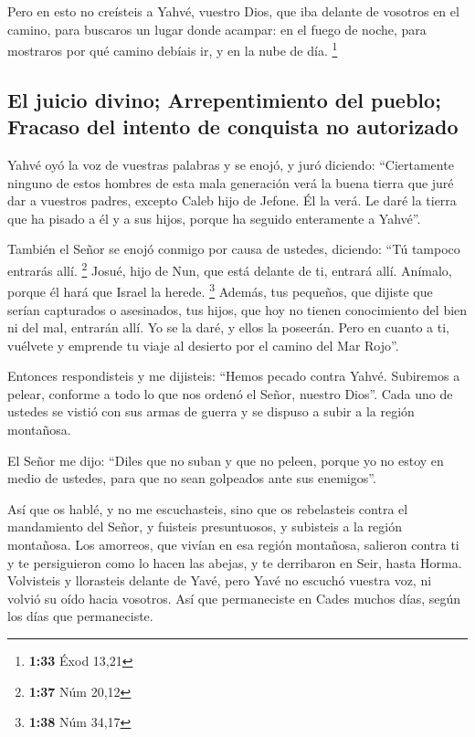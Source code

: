 \begin{paracol}{2}
 Pero en esto no creísteis a Yahvé, vuestro Dios,
 que iba delante de vosotros en el camino, para buscaros
un lugar donde acampar: en el fuego de noche, para mostraros por qué
camino debíais ir, y en la nube de día. \footnote{\textbf{1:33} Éxod
  13,21}

\hypertarget{el-juicio-divino-arrepentimiento-del-pueblo-fracaso-del-intento-de-conquista-no-autorizado}{%
\subsection{El juicio divino; Arrepentimiento del pueblo; Fracaso del
intento de conquista no
autorizado}\label{el-juicio-divino-arrepentimiento-del-pueblo-fracaso-del-intento-de-conquista-no-autorizado}}

 Yahvé oyó la voz de vuestras palabras y se enojó, y juró
diciendo:  ``Ciertamente ninguno de estos hombres de esta
mala generación verá la buena tierra que juré dar a vuestros padres,
 excepto Caleb hijo de Jefone. Él la verá. Le daré la
tierra que ha pisado a él y a sus hijos, porque ha seguido enteramente a
Yahvé''.

 También el Señor se enojó conmigo por causa de ustedes,
diciendo: ``Tú tampoco entrarás allí. \footnote{\textbf{1:37} Núm 20,12}
 Josué, hijo de Nun, que está delante de ti, entrará
allí. Anímalo, porque él hará que Israel la herede. \footnote{\textbf{1:38}
  Núm 34,17}  Además, tus pequeños, que dijiste que
serían capturados o asesinados, tus hijos, que hoy no tienen
conocimiento del bien ni del mal, entrarán allí. Yo se la daré, y ellos
la poseerán.  Pero en cuanto a ti, vuélvete y emprende tu
viaje al desierto por el camino del Mar Rojo''.

 Entonces respondisteis y me dijisteis: ``Hemos pecado
contra Yahvé. Subiremos a pelear, conforme a todo lo que nos ordenó el
Señor, nuestro Dios''. Cada uno de ustedes se vistió con sus armas de
guerra y se dispuso a subir a la región montañosa.

 El Señor me dijo: ``Diles que no suban y que no peleen,
porque yo no estoy en medio de ustedes, para que no sean golpeados ante
sus enemigos''.

 Así que os hablé, y no me escuchasteis, sino que os
rebelasteis contra el mandamiento del Señor, y fuisteis presuntuosos, y
subisteis a la región montañosa.  Los amorreos, que
vivían en esa región montañosa, salieron contra ti y te persiguieron
como lo hacen las abejas, y te derribaron en Seir, hasta Horma.
 Volvisteis y llorasteis delante de Yavé, pero Yavé no
escuchó vuestra voz, ni volvió su oído hacia vosotros. 
Así que permaneciste en Cades muchos días, según los días que
permaneciste.


\end{paracol}
